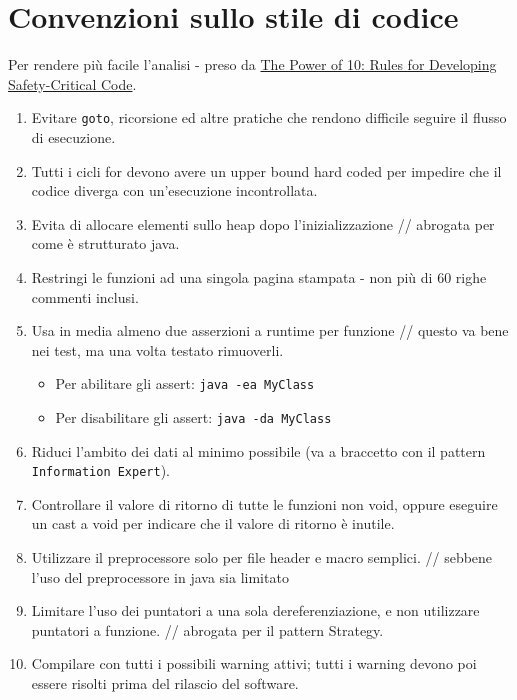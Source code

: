 \documentclass{article}
\begin{document}
\section{Convenzioni sullo stile di codice} Per rendere più facile l'analisi -
preso da \href{"https://web.eecs.umich.edu/~imarkov/10rules.pdf"}{The Power of 
10: Rules for Developing Safety-Critical Code}.
\begin{enumerate}
    \item Evitare \texttt{goto}, ricorsione ed altre pratiche che rendono 
    difficile seguire il flusso di esecuzione.
    \item Tutti i cicli for devono avere un upper bound hard coded per impedire
    che il codice diverga con un'esecuzione incontrollata.
    \item Evita di allocare elementi sullo heap dopo l'inizializzazione // 
    abrogata per come è strutturato java.
    \item Restringi le funzioni ad una singola pagina stampata - non più di 60 
    righe commenti inclusi.
    \item Usa in media almeno due asserzioni a runtime per funzione // questo 
    va bene nei test, ma una volta testato rimuoverli.
    \begin{itemize}
        \item Per abilitare gli assert: \texttt{java -ea MyClass}
        \item Per disabilitare gli assert: \texttt{java -da MyClass}
    \end{itemize}
    \item Riduci l'ambito dei dati al minimo possibile (va a braccetto con il 
    pattern \texttt{Information Expert}). 
    \item Controllare il valore di ritorno di tutte le funzioni non void, 
    oppure eseguire un cast a void per indicare che il valore di ritorno è 
    inutile.
    \item Utilizzare il preprocessore solo per file header e macro semplici.
    // sebbene l'uso del preprocessore in java sia limitato
    \item Limitare l'uso dei puntatori a una sola dereferenziazione, e non 
    utilizzare puntatori a funzione. // abrogata per il pattern Strategy.
    \item Compilare con tutti i possibili warning attivi; tutti i warning 
    devono poi essere risolti prima del rilascio del software.
\end{enumerate}
\end{document}

